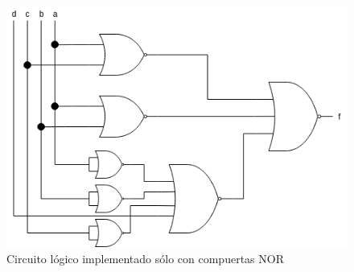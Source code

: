 \begin{figure}[H]
    \centering
    \includegraphics[scale=0.5]{EJ_2/resources/ej_2_maxterms_1.png}
    \caption{Circuito l\'ogico implementado s\'olo con compuertas NOR}
\end{figure}
